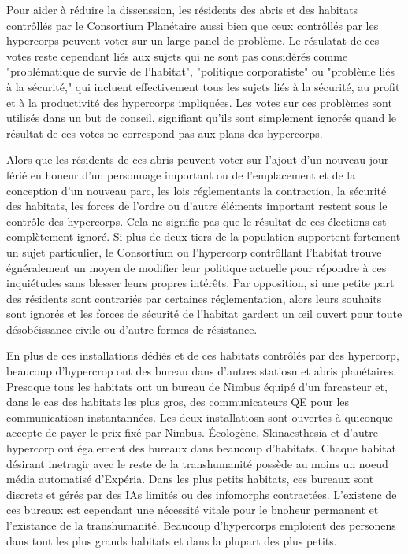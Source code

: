 Pour aider à réduire la dissenssion, les résidents des abris et des habitats contrôllés par le Consortium Planétaire aussi bien que ceux contrôllés par les hypercorps peuvent voter sur un large panel de problème. Le résulatat de ces votes reste cependant liés aux sujets qui ne sont pas considérés comme "problématique de survie de l'habitat", "politique corporatiste" ou "problème liés à la sécurité," qui incluent effectivement tous les sujets liés à la sécurité, au profit et à la productivité des hypercorps impliquées. Les votes sur ces problèmes sont utilisés dans un but de conseil, signifiant qu'ils sont simplement ignorés quand le résultat de ces votes ne correspond pas aux plans des hypercorps. 

Alors que les résidents de ces abris peuvent voter sur l'ajout d'un nouveau jour férié en honeur d'un personnage important ou de l'emplacement et de la conception d'un nouveau parc, les lois réglementants la contraction, la sécurité des habitats, les forces de l'ordre ou d'autre éléments important restent sous le contrôle des hypercorps. Cela ne signifie pas que le résultat de ces élections est complètement ignoré. Si plus de deux tiers de la population supportent fortement un sujet particulier, le Consortium ou l'hypercorp contrôllant l'habitat trouve égnéralement un moyen de modifier leur politique actuelle pour répondre à ces inquiétudes sans blesser leurs propres intérêts. Par opposition, si une petite part des résidents sont contrariés par certaines réglementation, alors leurs souhaits sont ignorés et les forces de sécurité de l'habitat gardent un œil ouvert pour toute désobéissance civile ou d'autre formes de résistance. 

En plus de ces installations dédiés et de ces habitats contrôlés par des hypercorp, beaucoup d'hypercrop ont des bureau dans d'autres statiosn et abris planétaires. Presqque tous les habitats ont un bureau de Nimbus équipé d'un farcasteur et, dans le cas des habitats les plus gros, des communicateurs QE pour les communicatiosn instantannées. Les deux installatiosn sont ouvertes à quiconque accepte de payer le prix fixé par Nimbus. Écologène, Skinaesthesia et d'autre hypercorp ont également des bureaux dans beaucoup d'habitats. Chaque habitat désirant inetragir avec le reste de la transhumanité possède au moins un noeud média automatisé d'Expéria. Dans les plus petits habitats, ces bureaux sont discrets et gérés par des IAs limités ou des infomorphs contractées. L'existenc de ces bureaux est cependant une nécessité vitale pour le bnoheur permanent et l'existance de la transhumanité. Beaucoup d'hypercorps emploient des personens dans tout les plus grands habitats et dans la plupart des plus petits. 

